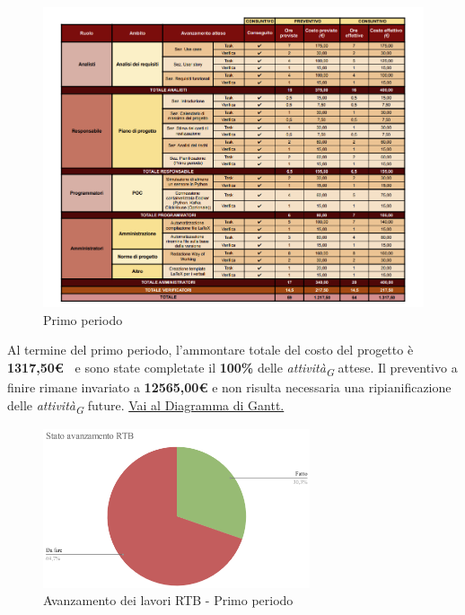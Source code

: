 \begin{figure}[H]
    \centering
    \includegraphics[height=0.9\textwidth]{../Images/tabG1.PNG}
    \caption{Primo periodo}
    \label{fig:Primo_periodo}
\end{figure}


Al termine del primo periodo, l'ammontare totale del costo del progetto è \textbf{ 1317,50\euro\ } e sono state completate il \textbf{100\%} delle \textit{attività}\textsubscript{\textit{G}} attese.
Il preventivo a finire rimane invariato a \textbf{12565,00€} e non risulta necessaria una ripianificazione delle \textit{attività}\textsubscript{\textit{G}} future.
\href{https://github.com/orgs/ByteOps-swe/projects/3/views/1?sortedBy%5Bdirection%5D=asc&sortedBy%5BcolumnId%5D=64182560}{Vai al Diagramma di Gantt.}

\pagebreak

\begin{figure}[H]
    \centering
    \begin{minipage}[b]{0.70\textwidth}
        \centering
        \includegraphics[width=0.7\textwidth]{../Images/torta1.png}
        \caption{Avanzamento dei lavori RTB - Primo periodo}
        \label{fig:Avanzamento_RTB_1}
    \end{minipage}
\end{figure}

